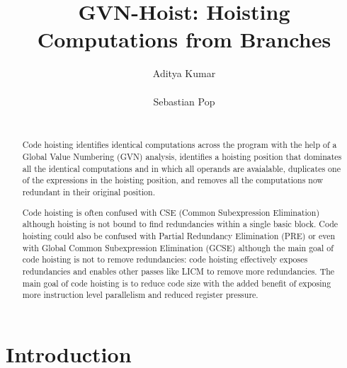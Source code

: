 \documentclass{sig-alternate}
\begin{document}
\def \SCoP {SCoP}
\def \GCC {GCC}
\def \LLVM {LLVM}
\def \SESE {SESE}
\def \CFG {CFG}
\def \SSA {SSA}
\def \scev {scev}

\setlength{\pdfpageheight}{\paperheight}
\setlength{\pdfpagewidth}{\paperwidth}

\title{GVN-Hoist: Hoisting Computations from Branches}


\author{
\alignauthor
Aditya Kumar\\
       \\
\alignauthor
Sebastian Pop\\
       \\
}

\maketitle
\begin{abstract}
  Code hoisting identifies identical computations across the program with the
  help of a Global Value Numbering (GVN) analysis, identifies a hoisting
  position that dominates all the identical computations and in which all
  operands are avaialable, duplicates one of the expressions in the hoisting
  position, and removes all the computations now redundant in their original
  position.

  Code hoisting is often confused with CSE (Common Subexpression Elimination)
  although hoisting is not bound to find redundancies within a single basic
  block.  Code hoisting could also be confused with Partial Redundancy
  Elimination (PRE) or even with Global Common Subexpression Elimination (GCSE)
  although the main goal of code hoisting is not to remove redundancies: code
  hoisting effectively exposes redundancies and enables other passes like LICM
  to remove more redundancies.  The main goal of code hoisting is to reduce code
  size with the added benefit of exposing more instruction level parallelism and
  reduced register pressure.
\end{abstract}

\section{Introduction}
\end{document}
